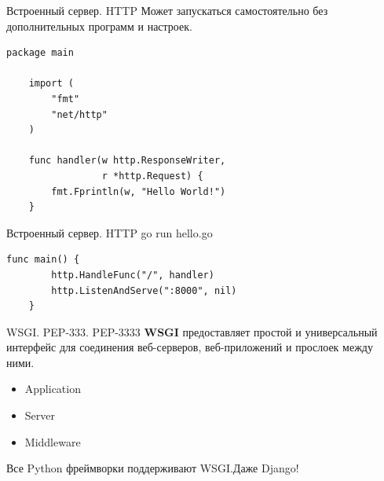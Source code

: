 \begin{frame}[fragile]{Встроенный сервер. HTTP}
    Может запускаться самостоятельно без дополнительных программ и
    настроек.

    \begin{lstlisting}[style=go, caption=Go]
    package main

    import (
        "fmt"
        "net/http"
    )

    func handler(w http.ResponseWriter,
                 r *http.Request) {
        fmt.Fprintln(w, "Hello World!")
    }
    \end{lstlisting}
\end{frame}

\begin{frame}[fragile]{Встроенный сервер. HTTP}
    go run hello.go
    \begin{lstlisting}[style=go, caption=Go]
    func main() {
        http.HandleFunc("/", handler)
        http.ListenAndServe(":8000", nil)
    }
    \end{lstlisting}
\end{frame}

\begin{frame}{WSGI. PEP-333. PEP-3333}
    \textbf{WSGI} предоставляет простой и универсальный интерфейс
    для соединения веб-серверов, веб-приложений и прослоек между ними.

    \begin{itemize}
        \item Application
        \item Server
        \item Middleware
    \end{itemize}

    Все Python фреймворки поддерживают WSGI.\newline Даже Django!


\end{frame}


